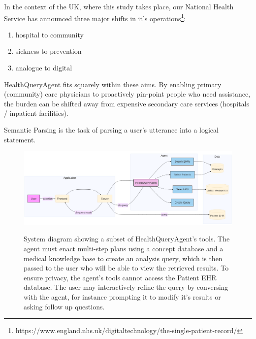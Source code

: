 \documentclass[11pt]{article}
\begin{document}


In the context of the UK, where this study takes place, our National Health Service has announced three major shifts in it's operations\footnote{https://www.england.nhs.uk/digitaltechnology/the-single-patient-record/}:

\begin{enumerate}
	\item hospital to community
	\item sickness to prevention
	\item analogue to digital
\end{enumerate}

HealthQueryAgent fits squarely within these aims. By enabling primary (community) care physicians to proactively pin-point people who need assistance, the burden can be shifted away from expensive secondary care services (hospitals / inpatient facilities).


Semantic Parsing is the task of parsing a user's utterance into a logical statement.



\begin{figure}[t]
  \includegraphics[width=\linewidth]{content/system_diagram3.png}
	\label{system-diagram}
	\caption{System diagram showing a subset of HealthQueryAgent's tools. The agent must enact multi-step plans using a concept database and a medical knowledge base to create an analysis query, which is then passed to the user who will be able to view the retrieved results. To ensure privacy, the agent's tools cannot access the Patient EHR database. The user may interactively refine the query by conversing with the agent, for instance prompting it to modify it's results or asking follow up questions.}
\end{figure}
\end{document}
